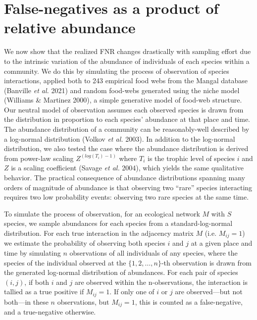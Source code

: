 \documentclass[10pt,oneside]{article}
\begin{document}
\hypertarget{false-negatives-as-a-product-of-relative-abundance}{%
\section{False-negatives as a product of relative
abundance}\label{false-negatives-as-a-product-of-relative-abundance}}

We now show that the realized FNR changes drastically with sampling
effort due to the intrinsic variation of the abundance of individuals of
each species within a community. We do this by simulating the process of
observation of species interactions, applied both to 243 empirical food
webs from the Mangal database (Banville \emph{et al.} 2021) and random
food-webs generated using the niche model (Williams \& Martinez 2000), a
simple generative model of food-web structure. Our neutral model of
observation assumes each observed species is drawn from the distribution
in proportion to each species' abundance at that place and time. The
abundance distribution of a community can be reasonably-well described
by a log-normal distribution (Volkov \emph{et al.} 2003). In addition to
the log-normal distribution, we also tested the case where the abundance
distribution is derived from power-law scaling \(Z^{(log(T_i)-1)}\)
where \(T_i\) is the trophic level of species \(i\) and \(Z\) is a
scaling coefficient (Savage \emph{et al.} 2004), which yields the same
qualitative behavior. The practical consequence of abundance
distributions spanning many orders of magnitude of abundance is that
observing two ``rare'' species interacting requires two low probability
events: observing two rare species at the same time.

To simulate the process of observation, for an ecological network \(M\)
with \(S\) species, we sample abundances for each species from a
standard-log-normal distribution. For each true interaction in the
adjacency matrix \(M\) (i.e. \(M_{ij}=1\)) we estimate the probability
of observing both species \(i\) and \(j\) at a given place and time by
simulating \(n\) observations of all individuals of any species, where
the species of the individual observed at the \(\{1,2,\dots,n\}\)-th
observation is drawn from the generated log-normal distribution of
abundances. For each pair of species \((i,j)\), if both \(i\) and \(j\)
are observed within the n-observations, the interaction is tallied as a
true positive if \(M_{ij}=1\). If only one of \(i\) or \(j\) are
observed---but not both---in these \(n\) observations, but \(M_{ij}=1\),
this is counted as a false-negative, and a true-negative otherwise.
\end{document}
